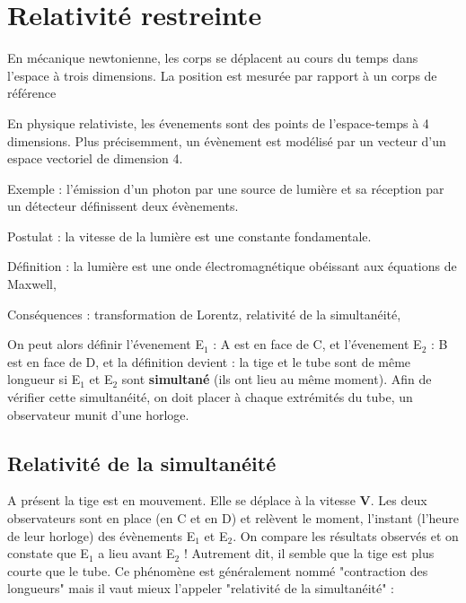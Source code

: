 
\section{Relativité restreinte}
En mécanique newtonienne, les corps se déplacent au cours du temps dans l'espace à trois dimensions. La position est mesurée par rapport à un corps de référence



En physique relativiste, les évenements sont des points de l'espace-temps à 4 dimensions.
Plus précisemment, un évènement est modélisé par un vecteur d'un espace vectoriel de dimension 4.

Exemple : l'émission d'un photon par une source de lumière et sa réception par un détecteur définissent deux évènements.



Postulat : la vitesse de la lumière est une constante fondamentale.

Définition : la lumière est une onde électromagnétique obéissant aux équations de Maxwell, 

Conséquences : transformation de Lorentz, relativité de la simultanéité, 

On peut alors définir l'évenement E$_1$ : A est en face de C, et l'évenement E$_2$ : B est en face de D, et la définition devient : la tige et le tube sont de même longueur si E$_1$ et E$_2$ sont {\bf simultané} (ils ont lieu au même moment). Afin de vérifier cette simultanéité, on doit placer à chaque extrémités du tube, un observateur munit d'une horloge.

\subsection{Relativité de la simultanéité}

A présent la tige est en mouvement. Elle se déplace à la vitesse {\bf V}. Les deux observateurs sont en place (en C et en D) et relèvent le moment, l'instant (l'heure de leur horloge) des évènements E$_1$ et E$_2$. On compare les résultats observés et on constate que E$_1$ a lieu avant E$_2$ ! Autrement dit, il semble que la tige est plus courte que le tube. Ce phénomène est généralement nommé "contraction des longueurs" mais il vaut mieux l'appeler "relativité de la simultanéité" : 
\begin{center}
\end{center}

